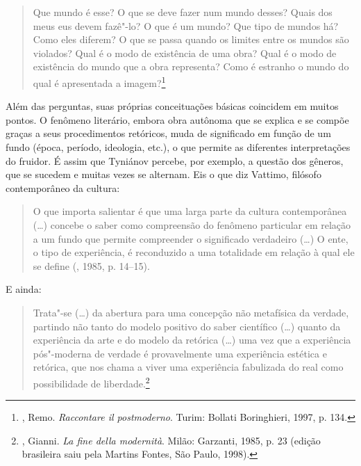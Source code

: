 \begin{quotation}
Que mundo é esse? O que se deve fazer num mundo desses? Quais dos meus
eus devem fazê"-lo? O que é um mundo? Que tipo de mundos há? Como eles
diferem? O que se passa quando os limites entre os mundos são violados?
Qual é o modo de existência de uma obra? Qual é o modo de existência do
mundo que a obra representa? Como é estranho o mundo do qual é
apresentada a imagem?\footnote{, Remo. 
\emph{Raccontare il postmoderno}. Turim: Bollati Boringhieri, 1997,
 p. 134.}
\end{quotation}

Além das perguntas, suas próprias conceituações básicas coincidem em
muitos pontos. O fenômeno literário, embora obra autônoma que se explica
e se compõe graças a seus procedimentos retóricos, muda de
significado em função de um fundo (época, período, ideologia, etc.), o
que permite as diferentes interpretações do fruidor. É assim que
Tyniánov percebe, por exemplo, a questão dos gêneros, que se sucedem e muitas
vezes se alternam. Eis o que diz Vattimo, filósofo contemporâneo da cultura:

\begin{quotation}
O que importa salientar é que uma larga parte da cultura contemporânea
(\ldots{}) concebe o saber como compreensão do fenômeno particular em
relação a um fundo que permite compreender o significado verdadeiro
(\ldots{}) O ente, o tipo de experiência, é reconduzido a uma
totalidade em relação à qual ele se define (, 1985, p. 14--15).
\end{quotation}

E ainda:

\begin{quotation}
Trata"-se (\ldots{}) da abertura para uma concepção não metafísica da
verdade, partindo não tanto do modelo positivo do saber científico
(\ldots{}) quanto da experiência da arte e do modelo da retórica (\ldots{}) uma vez que a experiência pós"-moderna de verdade é
provavelmente uma experiência estética e retórica, que nos chama a viver
uma experiência fabulizada do real como possibilidade de liberdade.\footnote{, Gianni. \emph{La fine della modernità}. Milão:
 Garzanti, 1985, p. 23 (edição brasileira saiu pela Martins Fontes,
 São Paulo, 1998).}
\end{quotation}

